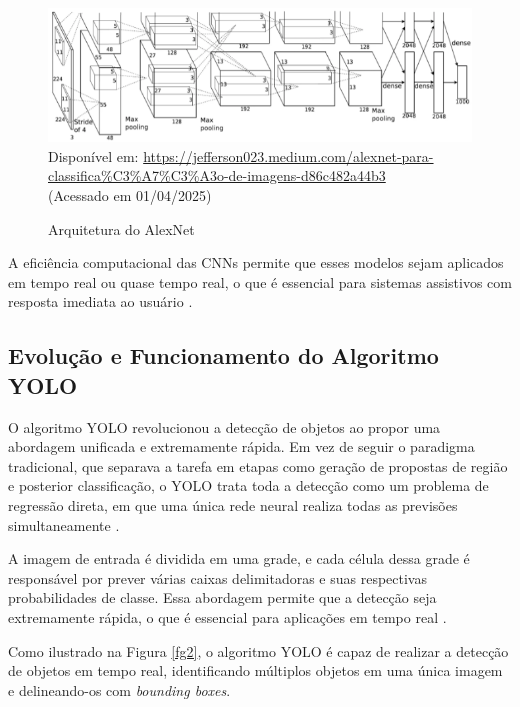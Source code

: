 \begin{figure}[htbp]
  \centering
  \caption{Arquitetura do AlexNet}
  \includegraphics[width=1.0\textwidth]{Figuras/arquitetura-alexnet.png}
  \\
  Disponível em: \url{https://jefferson023.medium.com/alexnet-para-classifica%C3%A7%C3%A3o-de-imagens-d86c482a44b3} \\(Acessado em 01/04/2025)
  \label{fg1}
\end{figure}

A eficiência computacional das CNNs permite que esses modelos sejam aplicados em tempo real ou quase tempo real, o que é essencial para sistemas assistivos com resposta imediata ao usuário \cite{bochkovskiy2020}.

\subsection{\textbf{Evolução e Funcionamento do Algoritmo YOLO}}

O algoritmo YOLO revolucionou a detecção de objetos ao propor uma abordagem unificada e extremamente rápida. Em vez de seguir o paradigma tradicional, que separava a tarefa em etapas como geração de propostas de região e posterior classificação, o YOLO trata toda a detecção como um problema de regressão direta, em que uma única rede neural realiza todas as previsões simultaneamente \cite{redmon2016}.

A imagem de entrada é dividida em uma grade, e cada célula dessa grade é responsável por prever várias caixas delimitadoras e suas respectivas probabilidades de classe. Essa abordagem permite que a detecção seja extremamente rápida, o que é essencial para aplicações em tempo real \cite{bochkovskiy2020}.

Como ilustrado na Figura \ref{fg2}, o algoritmo YOLO é capaz de realizar a detecção de objetos em tempo real, identificando múltiplos objetos em uma única imagem e delineando-os com \textit{bounding boxes}.

